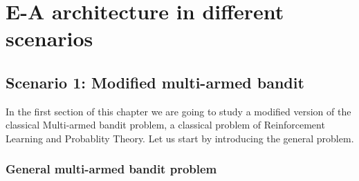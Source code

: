 \documentclass[11pt,a4paper,twoside]{report}
\newcommand{\+}{\textnormal{+} }
\theoremstyle{definition}
\numberwithin{equation}{chapter}
\begin{document}
\chapter{E-A architecture in different scenarios} 
\label{Scenarios}
\section{Scenario 1: Modified multi-armed bandit}
In the first section of this chapter we are going to study a modified version of
the classical Multi-armed bandit problem, a classical problem of Reinforcement
Learning and Probablity Theory. Let us start by introducing the general problem.
\subsection{General multi-armed bandit problem}
\end{document}
